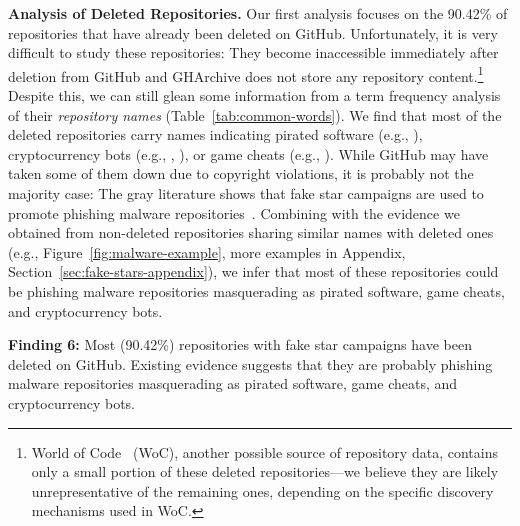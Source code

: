 \textbf{Analysis of Deleted Repositories.}
Our first analysis focuses on the 90.42\% of repositories that have already been deleted on GitHub. 
Unfortunately, it is very difficult to study these repositories: They become inaccessible immediately after deletion from GitHub and \textsf{GHArchive} does not store any repository content.\footnote{
World of Code~\cite{DBLP:journals/ese/MaDBAVTKZM21} (WoC), another possible source of repository data, contains only a small portion of these deleted repositories---we believe they are likely unrepresentative of the remaining ones, depending on the specific discovery mechanisms used in WoC.
}
Despite this, we can still glean some information from a term frequency analysis of their \emph{repository names} (Table~\ref{tab:common-words}). 
We find that most of the deleted repositories carry names indicating pirated software (e.g., ), cryptocurrency bots (e.g., , ), or game cheats (e.g., ).
While GitHub may have taken some of them down due to copyright violations, it is probably not the majority case: The gray literature shows that fake star campaigns are used to promote phishing malware repositories~\cite{stargazer-goblin}. %
Combining with the evidence we obtained from non-deleted repositories sharing similar names with deleted ones (e.g., Figure~\ref{fig:malware-example}, more examples in Appendix, Section~\ref{sec:fake-stars-appendix}),
we infer that most of these repositories could be phishing malware repositories masquerading as pirated software, game cheats, and cryptocurrency bots.

\begin{summary-rq}
\textbf{Finding 6:}
Most (90.42\%) repositories with fake star campaigns have been deleted on GitHub. 
Existing evidence suggests that they are probably phishing malware repositories masquerading as pirated software, game cheats, and cryptocurrency bots.
\end{summary-rq}

